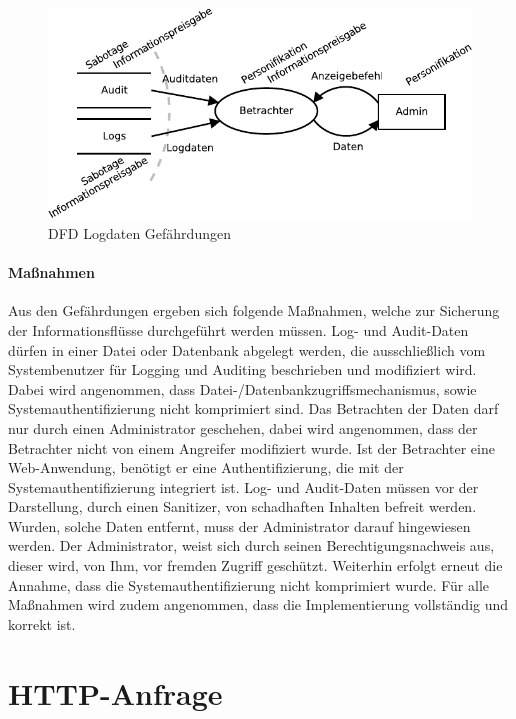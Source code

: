 \documentclass[11pt,a4paper]{report}
\begin{document}
\begin{figure}[htbp]
\centering
\includegraphics[scale=1.2]{images/dfd_logs_threats.pdf}
\caption{DFD Logdaten Gefährdungen}
\label{fig:dfd_logs_threat}
\end{figure}

\paragraph{Maßnahmen}

Aus den Gefährdungen ergeben sich folgende Maßnahmen, welche zur Sicherung der Informationsflüsse durchgeführt werden müssen. Log- und Audit-Daten dürfen in einer Datei oder Datenbank abgelegt werden, die ausschließlich vom Systembenutzer für Logging und Auditing beschrieben und modifiziert wird. Dabei wird angenommen, dass Datei-/Datenbankzugriffsmechanismus, sowie Systemauthentifizierung nicht komprimiert sind. Das Betrachten der Daten darf nur durch einen Administrator geschehen, dabei wird angenommen, dass der Betrachter nicht von einem Angreifer modifiziert wurde. Ist der Betrachter eine Web-Anwendung, benötigt er eine Authentifizierung, die mit der Systemauthentifizierung integriert ist. Log- und Audit-Daten müssen vor der Darstellung, durch einen Sanitizer, von schadhaften Inhalten befreit werden. Wurden, solche Daten entfernt, muss der Administrator darauf hingewiesen werden. Der Administrator, weist sich durch seinen Berechtigungsnachweis aus, dieser wird, von Ihm, vor fremden Zugriff geschützt. Weiterhin erfolgt erneut die Annahme, dass die Systemauthentifizierung nicht komprimiert wurde. Für alle Maßnahmen wird zudem angenommen, dass die Implementierung vollständig und korrekt ist.

\section{HTTP-Anfrage} \label{sec:model_http}
\end{document}
